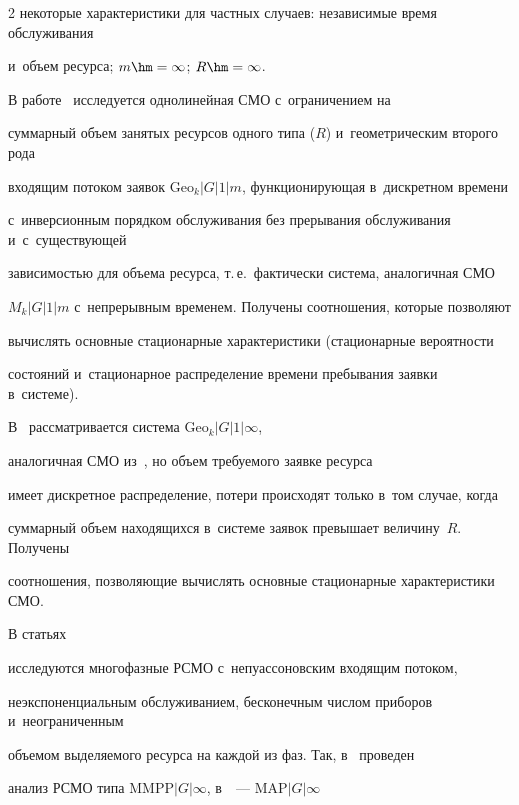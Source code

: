 \begin{multicols}{2}
некоторые характеристики для частных случаев: независимые время обслуживания 


и~объем ресурса; $m\hm=\infty$; $R\hm=\infty$.





В работе~\cite{Pechinkin_28_2011} исследуется однолинейная СМО с~ограничением на 


суммарный объем занятых ресурсов одного типа ($R$) и~геометрическим второго рода 


входящим потоком заявок $\mathrm{Geo}_k|G|1|m$, функционирующая в~дискретном времени 


с~инверсионным порядком обслуживания без прерывания обслуживания и~с~существующей 


зависимостью для объема ресурса, т.\,е.\ фактически сис\-те\-ма, аналогичная СМО 


$M_k|G|1|m$ с~непрерывным временем. Получены соотношения, которые позволяют 


вычислять основные стационарные характеристики (стационарные ве\-ро\-ят\-ности 


состояний и~стационарное распределение времени пребывания заявки в~сис\-теме).





В~\cite{Pechinkin_29_2012} рассматривается сис\-те\-ма $\mathrm{Geo}_k|G|1|\infty$, 


аналогичная СМО из~\cite{Pechinkin_28_2011}, но объем требуемого заявке ресурса 


имеет дискретное распределение, потери происходят только в~том случае, когда 


суммарный объем находящихся в~сис\-те\-ме заявок превышает величину~$R$. Получены 


соотношения, позволяющие вычислять основные стационарные характеристики СМО.





В статьях~\cite{Mois_1_2017,Mois_2_2017,Mois_3_2016,Mois_4_2017,Mois_5_2017} 


исследуются многофазные РСМО с~непуассоновским входящим потоком, 


неэкспоненциальным обслуживанием, бесконечным числом приборов и~неограниченным 


объемом выделяемого ресурса на каждой из фаз. Так, в~\cite{Mois_2_2017} проведен 


анализ РСМО типа $\mathrm{MMPP}|G|\infty$, в~\cite{Mois_3_2016}~--- $\mathrm{MAP}|G|\infty$ 



\end{multicols}
